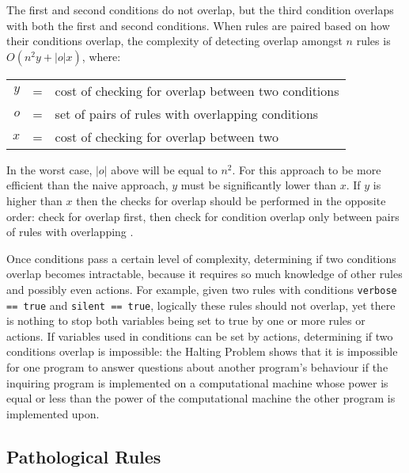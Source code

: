 \noindent{}The first and second conditions do not overlap, but the third
condition overlaps with both the first and second conditions.  When rules
are paired based on how their conditions overlap, the complexity of
detecting overlap amongst $n$ rules is $O\left(n^{2}y+|o|x\right)$, where:

\begin{tabular}[]{rcl}

    $y$ & = & cost of checking for overlap between two conditions \\
    $o$ & = & set of pairs of rules with overlapping conditions   \\
    $x$ & = & cost of checking for overlap between two \regexes{}    \\

\end{tabular}

In the worst case, $|o|$ above will be equal to $n^{2}$.  For this approach
to be more efficient than the naive approach, $y$ must be significantly
lower than $x$.  If $y$ is higher than $x$ then the checks for overlap
should be performed in the opposite order: check for 
overlap first, then check for condition overlap only between pairs of rules
with overlapping \regexes{}.

Once conditions pass a certain level of complexity, determining if two
conditions overlap becomes intractable, because it requires so much
knowledge of other rules and possibly even actions.  For example, given two
rules with conditions \verb!verbose == true! and \verb!silent == true!,
logically these rules should not overlap, yet there is nothing to stop both
variables being set to true by one or more rules or actions.  If variables
used in conditions can be set by actions, determining if two conditions
overlap is impossible: the Halting Problem shows that it is impossible for
one program to answer questions about another program's behaviour if the
inquiring program is implemented on a computational machine whose power is
equal or less than the power of the computational machine the other program
is implemented upon.

\subsection{Pathological Rules}

